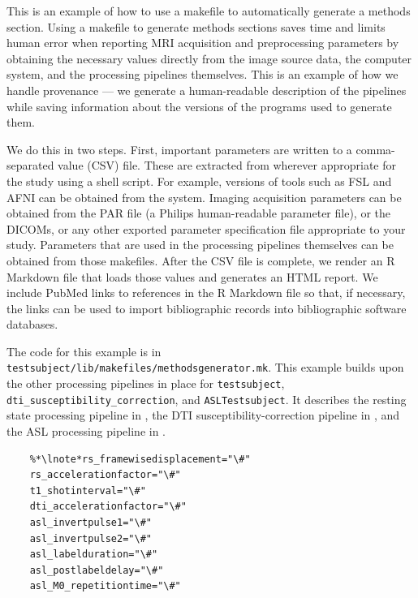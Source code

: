 \label{sec:provenance}
This is an example of how to use a makefile to automatically generate a methods section. Using a makefile to generate methods sections saves time and limits human error when reporting MRI acquisition and preprocessing parameters by obtaining the necessary values directly from the image source data, the computer system, and the processing pipelines themselves. This is an example of how we handle provenance --- we generate a human-readable description of the pipelines while saving information about the versions of the programs used to generate them. 

We do this in two steps. First, important parameters are written to a comma-separated value (CSV) file. These are extracted from wherever appropriate for the study using a \bashn{} shell script. For example, versions of tools such as FSL and AFNI can be obtained from the system. Imaging acquisition parameters can be obtained from the PAR file (a Philips human-readable parameter file), or the DICOMs, or any other exported parameter specification file appropriate to your study. Parameters that are used in the processing pipelines themselves can be obtained from those makefiles. After the CSV file is complete, we render an R Markdown file that loads those values and generates an HTML report. We include PubMed links to references in the R Markdown file so that, if necessary, the links can be used to import bibliographic records into bibliographic software databases. 

The code for this example is in \texttt{testsubject/lib/makefiles/methodsgenerator.mk}.  This example builds upon the other processing pipelines in place for \texttt{testsubject}, \texttt{dti_susceptibility_correction}, and \texttt{ASLTestsubject}. It describes the resting state processing pipeline in , the DTI susceptibility-correction pipeline in , and the ASL processing pipeline in .


\begin{lstlisting}
	%*\lnote*rs_framewisedisplacement="\#"
	rs_accelerationfactor="\#"
	t1_shotinterval="\#"
	dti_accelerationfactor="\#"
	asl_invertpulse1="\#"
	asl_invertpulse2="\#"
	asl_labelduration="\#"
	asl_postlabeldelay="\#"
	asl_M0_repetitiontime="\#"
\end{lstlisting}

